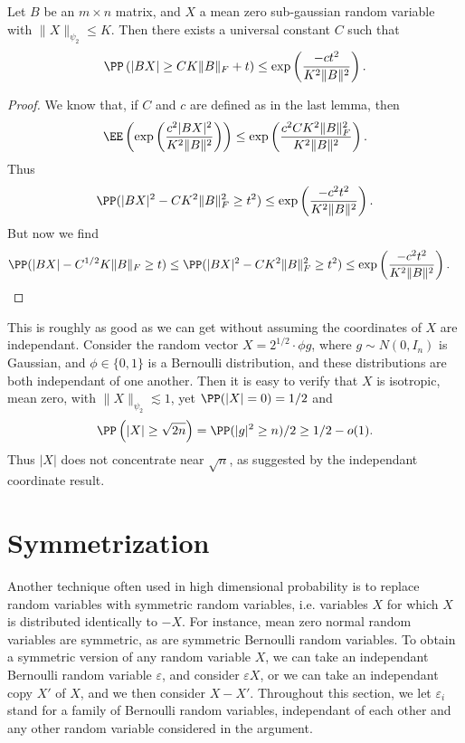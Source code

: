 \begin{theorem}
	Let $B$ be an $m \times n$ matrix, and $X$ a mean zero sub-gaussian random variable with $\| X \|_{\psi_2} \leq K$. Then there exists a universal constant $C$ such that
	\[ \PP \left( |BX| \geq C K \| B \|_F + t  \right) \leq \exp \left( \frac{-ct^2}{K^2 \| B \|^2} \right). \]
\end{theorem}
\begin{proof}
	We know that, if $C$ and $c$ are defined as in the last lemma, then
	\[ \EE \left( \exp \left( \frac{c^2 |BX|^2}{K^2 \| B \|^2} \right) \right) \leq \exp \left( \frac{c^2 C K^2 \| B \|_F^2}{K^2 \| B \|^2} \right). \]
	Thus
	\[ \PP( |BX|^2 - C K^2 \| B \|_F^2 \geq t^2) \leq \exp \left( \frac{-c^2 t^2}{K^2 \|B\|^2} \right). \]
	But now we find
	\begin{align*}
		\PP(|BX| - C^{1/2} K \| B \|_F \geq t) &\leq \PP(|BX|^2 - CK^2 \| B \|_F^2 \geq t^2) \leq \exp \left( \frac{-c^2 t^2}{K^2 \| B \|^2} \right). \qedhere
	\end{align*}
\end{proof}

\begin{remark}
	This is roughly as good as we can get without assuming the coordinates of $X$ are independant. Consider the random vector $X = 2^{1/2} \cdot \phi g$, where $g \sim N(0,I_n)$ is Gaussian, and $\phi \in \{ 0, 1 \}$ is a Bernoulli distribution, and these distributions are both independant of one another. Then it is easy to verify that $X$ is isotropic, mean zero, with $\| X \|_{\psi_2} \lesssim 1$, yet $\PP(|X| = 0) = 1/2$ and
	\begin{align*}
		\PP \left(|X| \geq \sqrt{2n} \right) = \PP(|g|^2 \geq n)/2 \geq 1/2 - o(1).
	\end{align*}
	Thus $|X|$ does not concentrate near $\sqrt{n}$, as suggested by the independant coordinate result.
\end{remark}




\section{Symmetrization}

Another technique often used in high dimensional probability is to replace random variables with symmetric random variables, i.e. variables $X$ for which $X$ is distributed identically to $-X$. For instance, mean zero normal random variables are symmetric, as are symmetric Bernoulli random variables. To obtain a symmetric version of any random variable $X$, we can take an independant Bernoulli random variable $\varepsilon$, and consider $\varepsilon X$, or we can take an independant copy $X'$ of $X$, and we then consider $X - X'$. Throughout this section, we let $\varepsilon_i$ stand for a family of Bernoulli random variables, independant of each other and any other random variable considered in the argument.

